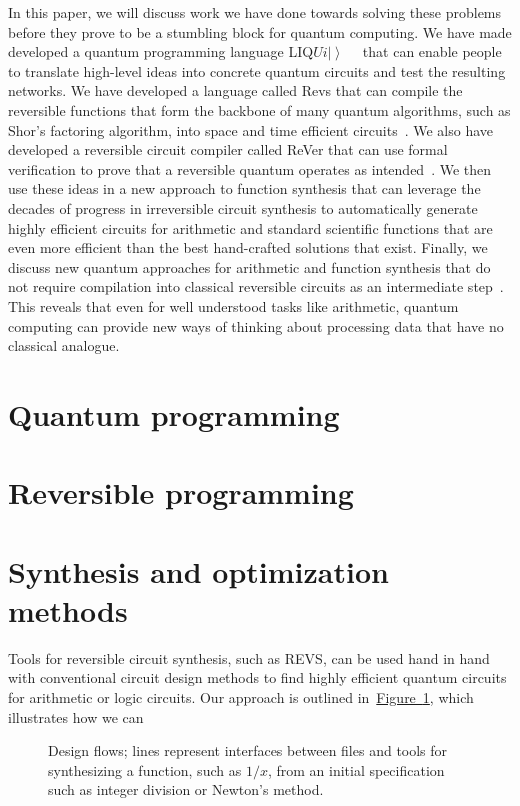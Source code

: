 \documentclass[conference]{IEEEtran}
\newcommand{\fig}[1]{\hyperref[fig:#1]{Figure~\ref*{fig:#1}}}
\newcommand{\ket}[1]{\left| #1\right\rangle}        %
\newcommand{\Liquid}{LIQ$Ui\ket{}$\ }
\begin{document}
In this paper, we will discuss work we have done towards solving these problems before they prove to be a stumbling block for quantum computing.  We have made developed a quantum programming language \Liquid~\cite{wecker2014liqui} that can enable people to translate high-level ideas into concrete quantum circuits and test the resulting networks.  We have developed a   language called Revs that can compile the reversible functions that form the backbone of many quantum algorithms, such as Shor's factoring algorithm, into space and time efficient circuits~\cite{parent2015reversible}.  We also have developed a reversible circuit compiler called ReVer that can use formal verification to prove that a reversible quantum operates as intended~\cite{amy2016verified}.  We then use these ideas in a new approach to function synthesis that can leverage the decades of progress in irreversible circuit synthesis to automatically generate highly efficient circuits for arithmetic and standard scientific functions that are even more efficient than the best hand-crafted solutions that exist.  Finally, we discuss new quantum approaches for arithmetic and function synthesis that do not require compilation into classical reversible circuits as an intermediate step~\cite{WR16}.  This reveals that even for well understood tasks like arithmetic, quantum computing can provide new ways of thinking about processing data that have no classical analogue.

\cite{PRS15}
\section{Quantum programming} %

\section{Reversible programming} %

\section{Synthesis and optimization methods}%
Tools for reversible circuit synthesis, such as REVS,  can be used hand in hand with conventional circuit design methods to find highly
efficient quantum circuits for arithmetic or logic circuits.  Our approach is outlined in~\fig{design-flows}, which illustrates how we can



\begin{figure}[t]
  \centering
  
  \caption{Design flows; lines represent interfaces between files and tools for synthesizing a function, such as $1/x$, from an initial specification such as integer division or Newton's method.}
  \label{fig:design-flows}
\end{figure}
\end{document}
